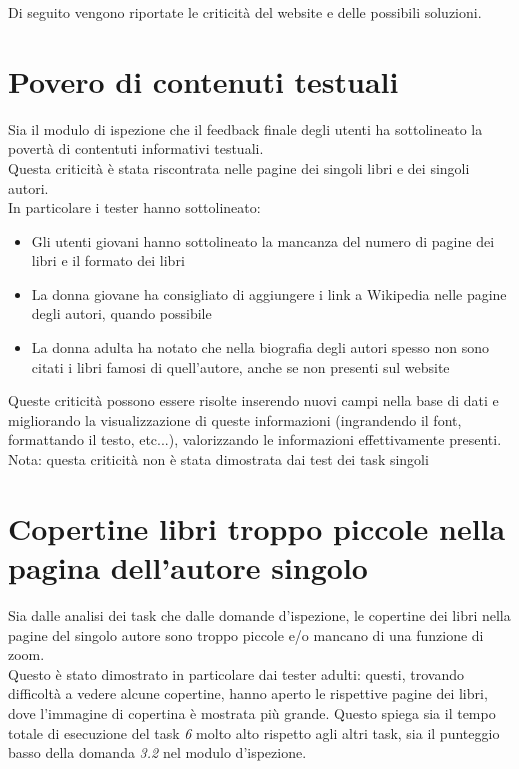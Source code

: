 \documentclass[12pt,a4paper,oneside]{report}
\begin{document}
Di seguito vengono riportate le criticità del website e delle possibili soluzioni.

\section{Povero di contenuti testuali}

Sia il modulo di ispezione che il feedback finale degli utenti ha sottolineato la povertà di contentuti informativi testuali. \\
Questa criticità è stata riscontrata nelle pagine dei singoli libri e dei singoli autori.\\
In particolare i tester hanno sottolineato:

\begin{itemize}
	\item Gli utenti giovani hanno sottolineato la mancanza del numero di pagine dei libri e il formato dei libri
	\item La donna giovane ha consigliato di aggiungere i link a Wikipedia nelle pagine degli autori, quando possibile
	\item La donna adulta ha notato che nella biografia degli autori spesso non sono citati i libri famosi di quell'autore, anche se non presenti sul website
\end{itemize}

Queste criticità possono essere risolte inserendo nuovi campi nella base di dati e migliorando la visualizzazione di queste informazioni (ingrandendo il font, formattando il testo, etc...), valorizzando le informazioni effettivamente presenti. \\

Nota: questa criticità non è stata dimostrata dai test dei task singoli

\section{Copertine libri troppo piccole nella pagina dell'autore singolo}

Sia dalle analisi dei task che dalle domande d'ispezione, le copertine dei libri nella pagine del singolo autore sono troppo piccole e/o mancano di una funzione di zoom. \\
Questo è stato dimostrato in particolare dai tester adulti: questi, trovando difficoltà a vedere alcune copertine, hanno aperto le rispettive pagine dei libri, dove l'immagine di copertina è mostrata più grande. Questo spiega sia il tempo totale di esecuzione del task \textit{6} molto alto rispetto agli altri task, sia il punteggio basso della domanda \textit{3.2} nel modulo d'ispezione.\\
\end{document}
